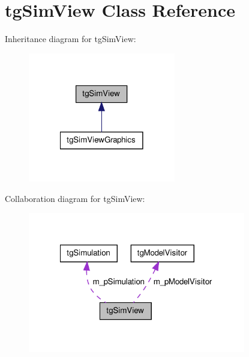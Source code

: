 \hypertarget{classtg_sim_view}{\section{tg\-Sim\-View Class Reference}
\label{classtg_sim_view}
}


Inheritance diagram for tg\-Sim\-View\-:\nopagebreak
\begin{figure}[H]
\begin{center}
\leavevmode
\includegraphics[width=182pt]{classtg_sim_view__inherit__graph}
\end{center}
\end{figure}


Collaboration diagram for tg\-Sim\-View\-:\nopagebreak
\begin{figure}[H]
\begin{center}
\leavevmode
\includegraphics[width=269pt]{classtg_sim_view__coll__graph}
\end{center}
\end{figure}
